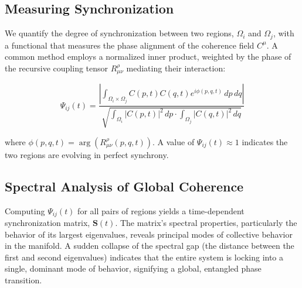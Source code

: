 
\subsection{Measuring Synchronization}
\label{11.4.1:measuring_synchronization}

We quantify the degree of synchronization between two regions, \(\Omega_i\) and \(\Omega_j\), with a functional that measures the phase alignment of the coherence field \(C^\mu\). A common method employs a normalized inner product, weighted by the phase of the recursive coupling tensor \(R^\rho_{\mu\nu}\) mediating their interaction:

\begin{equation}
\Psi_{ij}(t) = \frac{\left|\int_{\Omega_i \times \Omega_j} C(p,t)C(q,t)e^{i\phi(p,q,t)} \, dp \, dq\right|}{\sqrt{\int_{\Omega_i} |C(p,t)|^2 \, dp \cdot \int_{\Omega_j} |C(q,t)|^2 \, dq}}
\end{equation}

where \(\phi(p,q,t) = \arg(R^\rho_{\mu\nu}(p,q,t))\). A value of \(\Psi_{ij}(t) \approx 1\) indicates the two regions are evolving in perfect synchrony.


\subsection{Spectral Analysis of Global Coherence}
\label{11.4.2:spectral_analysis_of_global_coherence}

Computing \(\Psi_{ij}(t)\) for all pairs of regions yields a time-dependent synchronization matrix, \(\mathbf{S}(t)\). The matrix's spectral properties, particularly the behavior of its largest eigenvalues, reveals principal modes of collective behavior in the manifold. A sudden collapse of the spectral gap (the distance between the first and second eigenvalues) indicates that the entire system is locking into a single, dominant mode of behavior, signifying a global, entangled phase transition. 